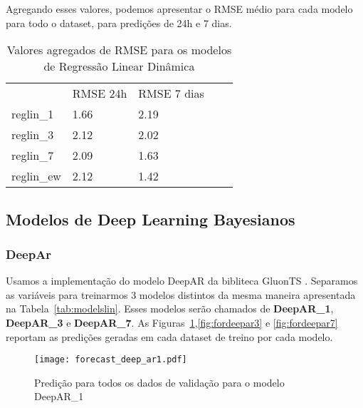 Agregando esses valores, podemos apresentar o RMSE médio para cada modelo para
todo o dataset, para predições de 24h e 7 dias.

\begin{center}
  \begin{table}[]
    \centering
    \begin{tabular}{l|llll}
      \cline{2-3}
      & \multicolumn{1}{l|}{RMSE 24h} & \multicolumn{1}{l|}{RMSE 7 dias} &  \\ \cline{1-3}
      \multicolumn{1}{|l|}{reglin\_1} & 1.66                          & 2.19                             &  \\ \cline{1-1}
      \multicolumn{1}{|l|}{reglin\_3} & 2.12                          & 2.02                             &  \\ \cline{1-1}
      \multicolumn{1}{|l|}{reglin\_7} & 2.09                          & 1.63                             &  \\ \cline{1-1}
      \multicolumn{1}{|l|}{reglin\_ew} & 2.12                          & 1.42                             &  \\ \cline{1-1}
    \end{tabular}
    \caption{Valores agregados de RMSE para os modelos de Regressão Linear Dinâmica}

    \label{tb:rmse_exp}
  \end{table}
\end{center}



\subsection{Modelos de Deep Learning Bayesianos}

\subsubsection{DeepAr}

Usamos a implementação do modelo DeepAR da bibliteca GluonTS \citep{gluonts}. Separamos as variáveis para treinarmos 3 modelos distintos da mesma maneira
apresentada na Tabela~\ref{tab:modelslin}. Esses modelos serão chamados de \textbf{DeepAR\_1}, \textbf{DeepAR\_3} e \textbf{DeepAR\_7}. 
As Figuras~\ref{fig:fordeepar1},\ref{fig:fordeepar3} e \ref{fig:fordeepar7} reportam as
predições geradas em cada dataset de treino por cada modelo.

\begin{figure}[H]
  \centering
  \texttt{[image: forecast\_deep\_ar1.pdf]} 
  \caption{Predição para todos os dados de validação para o modelo DeepAR\_1}
  \label{fig:fordeepar1}
\end{figure}


